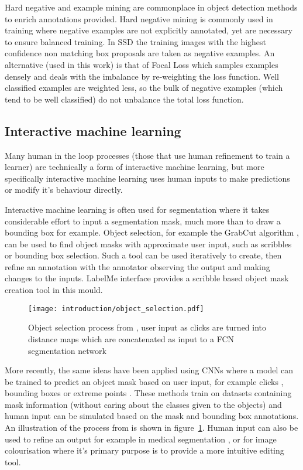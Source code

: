 Hard negative and example mining are commonplace in object detection methods to enrich annotations provided. Hard negative mining is commonly used in training where negative examples are not explicitly annotated, yet are necessary to ensure balanced training. In \gls{SSD} \cite{Liu2016a} the training images with the highest confidence non matching  box proposals are taken as negative examples. An alternative (used in this work) is that of Focal Loss \cite{Lin2017} which samples examples densely and deals with the imbalance by re-weighting the loss function. Well classified examples are weighted less, so the bulk of negative examples (which tend to be well classified) do not unbalance the total loss function.

\subsection{Interactive machine learning}

Many human in the loop processes (those that use human refinement to train a learner) are technically a form of interactive machine learning, but more specifically interactive machine learning uses human inputs to make predictions or modify it's behaviour directly.

Interactive machine learning is often used for segmentation where it takes considerable effort to input a segmentation mask, much more than to draw a bounding box for example. Object selection, for example the GrabCut algorithm \cite{Rother}, can be used to find object masks with approximate user input, such as scribbles or bounding box selection. Such a tool can be used iteratively to create, then refine an annotation with the annotator observing the output and making changes to the inputs.  LabelMe \cite{Russell2007} interface provides a scribble based object mask creation tool in this mould. 

\begin{figure}[h]
  \centering
  \texttt{[image: introduction/object\_selection.pdf]}
  \caption{Object selection process from \cite{Xu2016b}, user input as clicks are turned into distance maps which are concatenated as input to a \gls{FCN} segmentation network}  
  \label{fig:object_selection}
\end{figure}

More recently, the same ideas have been applied using \gls{CNN}s where a model can be trained to predict an object mask based on user input, for example clicks \cite{Xu2016b, Boroujerdi2017}, bounding boxes \cite {Xu2017} or extreme points \cite{Maninis2017}. These methods train on datasets containing mask information (without caring about the classes given to the objects) and human input can be simulated based on the mask and bounding box annotations. An illustration of the process from \cite{Xu2016b} is shown in figure~\ref{fig:object_selection}. Human input can also be used to refine an output for example in medical segmentation \cite{Wang2017}, or for image colourisation \cite{Zhang} where it's primary purpose is to provide a more intuitive editing tool.

